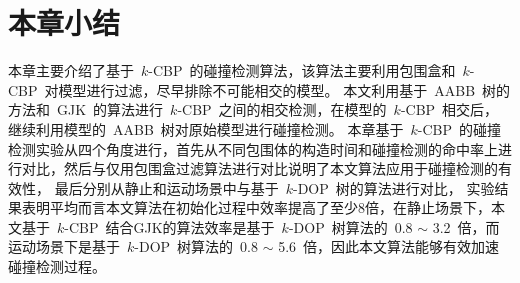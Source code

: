 \section{本章小结}
\label{sec:chap03:summary}

本章主要介绍了基于~$k$-CBP~的碰撞检测算法，该算法主要利用包围盒和~$k$-CBP~对模型进行过滤，尽早排除不可能相交的模型。
本文利用基于~AABB~树的方法和~GJK~的算法进行~$k$-CBP~之间的相交检测，在模型的~$k$-CBP~相交后，继续利用模型的~AABB~树对原始模型进行碰撞检测。
本章基于~$k$-CBP~的碰撞检测实验从四个角度进行，首先从不同包围体的构造时间和碰撞检测的命中率上进行对比，然后与仅用包围盒过滤算法进行对比说明了本文算法应用于碰撞检测的有效性，
最后分别从静止和运动场景中与基于~$k$-DOP~树的算法进行对比，
实验结果表明平均而言本文算法在初始化过程中效率提高了至少8倍，在静止场景下，本文基于~$k$-CBP~结合GJK的算法效率是基于~$k$-DOP~树算法的~0.8 $\sim$ 3.2~倍，而运动场景下是基于~$k$-DOP~树算法的~0.8 $\sim$ 5.6~倍，因此本文算法能够有效加速碰撞检测过程。

